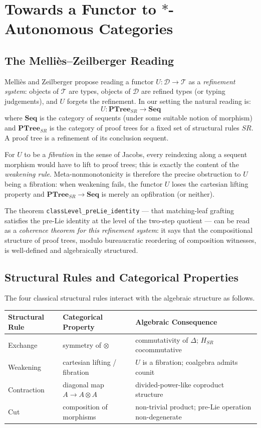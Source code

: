\documentclass[a4paper,11pt]{report}
\begin{document}
\section*{Towards a Functor to $*$-Autonomous Categories}

\subsection*{The Melli\`es--Zeilberger Reading}

Melli\`es and Zeilberger \cite{MZ15} propose reading a functor $U \colon \mathcal{D} \to \mathcal{T}$
as a \emph{refinement system}: objects of $\mathcal{T}$ are types, objects of $\mathcal{D}$ are
refined types (or typing judgements), and $U$ forgets the refinement.
In our setting the natural reading is:
\[
  U \colon \mathbf{PTree}_{SR} \longrightarrow \mathbf{Seq}
\]
where $\mathbf{Seq}$ is the category of sequents (under some suitable notion of morphism)
and $\mathbf{PTree}_{SR}$ is the category of proof trees for a fixed set of structural rules $SR$.
A proof tree is a refinement of its conclusion sequent.

For $U$ to be a \emph{fibration} in the sense of Jacobs, every reindexing along a sequent morphism
would have to lift to proof trees; this is exactly the content of the \emph{weakening rule}.
Meta-nonmonotonicity is therefore the precise obstruction to $U$ being a fibration:
when weakening fails, the functor $U$ loses the cartesian lifting property and
$\mathbf{PTree}_{SR} \to \mathbf{Seq}$ is merely an opfibration (or neither).

The theorem \texttt{classLevel\_preLie\_identity} --- that matching-leaf grafting satisfies
the pre-Lie identity at the level of the two-step quotient --- can be read as a
\emph{coherence theorem for this refinement system}: it says that the compositional structure
of proof trees, modulo bureaucratic reordering of composition witnesses,
is well-defined and algebraically structured.

\subsection*{Structural Rules and Categorical Properties}

The four classical structural rules interact with the algebraic structure as follows.

\begin{center}
\begin{tabular}{lll}
\hline
\textbf{Structural Rule} & \textbf{Categorical Property} & \textbf{Algebraic Consequence} \\
\hline
Exchange & symmetry of $\otimes$ & commutativity of $\Delta$; $H_{SR}$ cocommutative \\
Weakening & cartesian lifting / fibration & $U$ is a fibration; coalgebra admits counit \\
Contraction & diagonal map $A \to A \otimes A$ & divided-power-like coproduct structure \\
Cut & composition of morphisms & non-trivial product; pre-Lie operation non-degenerate \\
\hline
\end{tabular}
\end{center}
\end{document}
